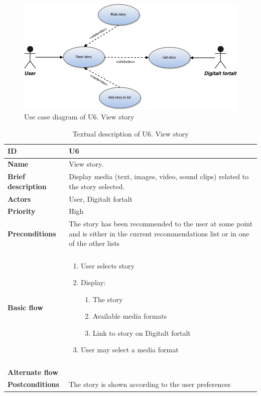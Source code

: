 \begin{figure}[htp]
	\includegraphics[width=\textwidth]{fig/U6}
	\centering
	\caption{Use case diagram of U6. View story}
	\label{Fig:U6}
\end{figure}

\begin{table}[htp]
	\centering
	\caption{Textual description of U6. View story}
	\begin{tabular}[b]{|l | l|}\hline
		\textbf{ID} 				& U6									\\\hline
		\textbf{Name} 				& View story.							\\\hline
		\textbf{Brief description}	& Display media (text, images, video, sound clips) related to the story selected. 		\\\hline
		\textbf{Actors} 			& User, Digitalt fortalt				\\\hline
		\textbf{Priority}			& High									\\\hline
		\textbf{Preconditions}		& The story has been recommended to the user at some point and is either in the current recommendations list or in one of the other lists			\\\hline&\\[-2ex]
		\textbf{Basic flow}			& \begin{minipage}{5in}
			\begin{enumerate}[noitemsep]
				\item User selects story
				\item Display:
					\begin{enumerate}
						\item The story
						\item Available media formats
						\item Link to story on Digitalt fortalt
					\end{enumerate}
				\item User may select a media format
			\end{enumerate}						
		\end{minipage}						\\\hline&\\[-2ex]
		\textbf{Alternate flow}		& \begin{minipage}{5in}
		\end{minipage}							\\\hline
		\textbf{Postconditions}		& The story is shown according to the user preferences\\\hline
	\end{tabular}
	\label{Tab:U6}
\end{table}

